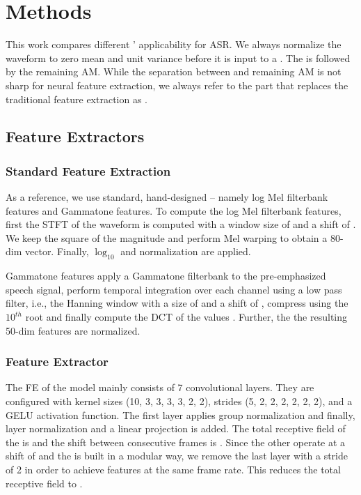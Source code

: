 \documentclass{INTERSPEECH2023}
\begin{document}
\section{Methods}
This work compares different \fes' applicability for \gls{ASR}.
We always normalize the waveform to zero mean and unit variance before it is input to a \fe.
The \fe is followed by the remaining \gls{AM}.
While the separation between \fe and remaining \gls{AM} is not sharp for neural feature extraction, we always refer to the part that replaces the traditional feature extraction as \fe.

\subsection{Feature Extractors}
\subsubsection{Standard Feature Extraction}
As a reference, we use standard, hand-designed \fes -- namely log Mel filterbank features and Gammatone features.
To compute the log Mel filterbank features, first the \gls{STFT} of the waveform is computed with a window size of  and a shift of .
We keep the square of the magnitude and perform Mel warping to obtain a 80-dim vector.
Finally, $\log_{10}$ and normalization are applied.

Gammatone features apply a Gammatone filterbank to the pre-emphasized speech signal, perform temporal integration over each channel using a low pass filter, i.e., the Hanning window with a size of  and a shift of , compress using the $10^{th}$ root and finally compute the \gls{DCT} of the values \cite{schlueter:icassp07}.
Further, the the resulting 50-dim features are normalized.

\subsubsection{\wvtwo Feature Extractor}
The \gls{FE} of the \wvtwo model \cite{facebook2020wav2vec2} mainly consists of 7 convolutional layers.
They are configured with kernel sizes (10, 3, 3, 3, 3, 2, 2), strides (5, 2, 2, 2, 2, 2, 2), and a GELU activation function.
The first layer applies group normalization and finally, layer normalization and a linear projection is added.
The total receptive field of the \wvtwo \fe is  and the shift between consecutive frames is .
Since the other \fes operate at a shift of  and the \wvtwo \fe is built in a modular way, we remove the last layer with a stride of 2 in order to achieve features at the same frame rate.
This reduces the total receptive field to .
\end{document}
